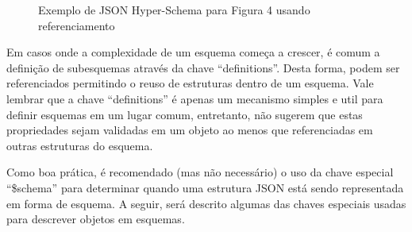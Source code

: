 \begin{figure}[h]
  \centering
  \inputminted[frame=single,framesep=10pt]{javascript}{anexos/pessoa-hyper-schema-\$ref.json}
  \caption{Exemplo de JSON Hyper-Schema para Figura 4 usando referenciamento}
\end{figure}

Em casos onde a complexidade de um esquema começa a crescer, é comum a definição de subesquemas através da chave “definitions”. Desta forma, podem ser referenciados permitindo o reuso de estruturas dentro de um esquema. Vale lembrar que a chave “definitions” é apenas um mecanismo simples e util para definir esquemas em um lugar comum, entretanto, não sugerem que estas propriedades sejam validadas em um objeto ao menos que referenciadas em outras estruturas do esquema. \cite{Leach2014}

Como boa prática, é recomendado (mas não necessário) o uso da chave especial “\$schema” para determinar quando uma estrutura JSON está sendo representada em forma de esquema. A seguir, será descrito algumas das chaves especiais usadas para descrever objetos em esquemas. \cite{Droettboom2015}

\begin{table}[ht!]
  \centering
  \caption{Subconjunto de chaves especiais JSON Schema}
\end{table}

